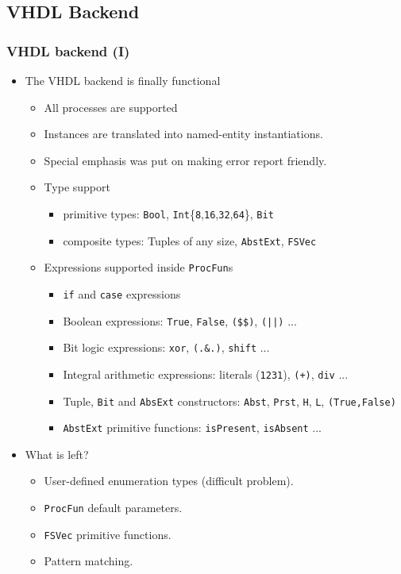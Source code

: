 \documentclass{beamer}
\begin{document}
\subsection{VHDL Backend}
\begin{frame}
  \frametitle{VHDL backend (I)}
\vspace{-0.2cm}
\begin{itemize}
\item The VHDL backend is finally functional
  \begin{itemize}
  \item All processes are supported
  \item Instances are translated into named-entity instantiations.
  \item Special emphasis was put on making error report friendly.
  \item Type support
    \begin{itemize}
    \item primitive types:
      \texttt{Bool}, \texttt{Int}\{\texttt{8},\texttt{16},\texttt{32},\texttt{64}\}, \texttt{Bit}
    \item composite types: 
      Tuples of any size, \texttt{AbstExt}, \texttt{FSVec}
    \end{itemize}
  \item Expressions supported inside \texttt{ProcFun}s
    \begin{itemize}
    \item \texttt{if} and \texttt{case} expressions
    \item Boolean expressions: \texttt{True}, \texttt{False}, \texttt{(\$\$)}, \texttt{(||)} ...      
    \item Bit logic expressions: \texttt{xor}, \texttt{(.\&.)}, \texttt{shift} ...
    \item Integral arithmetic expressions: literals (\texttt{1231}), \texttt{(+)}, \texttt{div} ...
    \item Tuple, \texttt{Bit} and \texttt{AbsExt} constructors: \texttt{Abst}, \texttt{Prst}, \texttt{H}, \texttt{L}, \texttt{(True,False)}
    \item \texttt{AbstExt} primitive functions: \texttt{isPresent}, \texttt{isAbsent} ...
    \end{itemize}
  \end{itemize}
\item What is left?
  \begin{itemize}
  \item User-defined enumeration types (difficult problem).
  \item \texttt{ProcFun} default parameters.
  \item \texttt{FSVec} primitive functions.
  \item Pattern matching.
  \end{itemize}
\end{itemize}
\end{frame}
\end{document}
